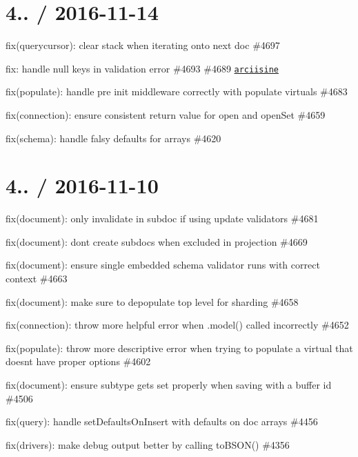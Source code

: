 \section*{4.. / 2016-\/11-\/14 }


\begin{DoxyItemize}
\item fix(querycursor)\+: clear stack when iterating onto next doc \#4697
\item fix\+: handle null keys in validation error \#4693 \#4689 \href{https://github.com/arciisine}{\tt arciisine}
\item fix(populate)\+: handle pre init middleware correctly with populate virtuals \#4683
\item fix(connection)\+: ensure consistent return value for open and open\+Set \#4659
\item fix(schema)\+: handle falsy defaults for arrays \#4620
\end{DoxyItemize}

\section*{4.. / 2016-\/11-\/10 }


\begin{DoxyItemize}
\item fix(document)\+: only invalidate in subdoc if using update validators \#4681
\item fix(document)\+: don\textquotesingle{}t create subdocs when excluded in projection \#4669
\item fix(document)\+: ensure single embedded schema validator runs with correct context \#4663
\item fix(document)\+: make sure to depopulate top level for sharding \#4658
\item fix(connection)\+: throw more helpful error when .model() called incorrectly \#4652
\item fix(populate)\+: throw more descriptive error when trying to populate a virtual that doesn\textquotesingle{}t have proper options \#4602
\item fix(document)\+: ensure subtype gets set properly when saving with a buffer id \#4506
\item fix(query)\+: handle set\+Defaults\+On\+Insert with defaults on doc arrays \#4456
\item fix(drivers)\+: make debug output better by calling to\+B\+S\+O\+N() \#4356
\end{DoxyItemize}

